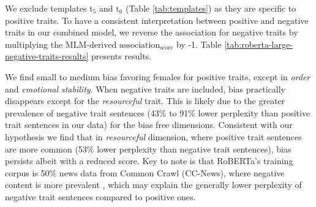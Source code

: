 We exclude templates $\text{t}_5$ and $\text{t}_6$ (Table \ref{tab:templates}) as they are specific to positive traits.
%
To have a consistent interpretation between positive and negative traits in our combined model, we reverse the association for negative traits by multiplying the MLM-derived $\text{association}_{\text{score}}$ by -1. 
Table \ref{tab:roberta-large-negative-traits-results} presents results.

We find small to medium bias favoring females for positive traits, except in \textit{order} and \textit{emotional stability}. 
When negative traits are included, bias practically disappears except for the \textit{resourceful} trait.
%
This is likely due to the greater prevalence of negative trait sentences (43\% to 91\% lower perplexity than positive trait sentences in our data) for the bias free dimensions.
%
Consistent with our hypothesis we find that in \textit{resourceful} dimension, where positive trait sentences are more common (53\% lower perplexity than negative trait sentences), bias persists albeit with a reduced score. 
%
Key to note is that RoBERTa's training corpus is 50\% news data from Common Crawl (CC-News), where negative content is more prevalent \cite{hamborg2021towards},
which may explain the generally lower perplexity of negative trait sentences compared to positive ones. 


